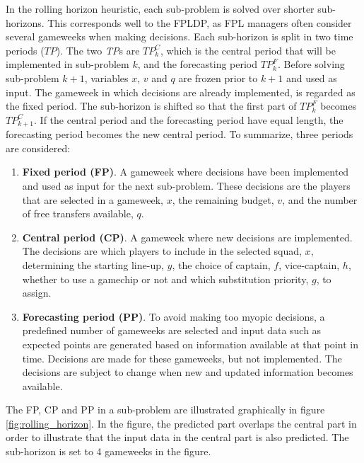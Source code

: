 \newpar

In the rolling horizon heuristic, each sub-problem is solved over shorter sub-horizons. This corresponds well to the FPLDP, as FPL managers often consider several gameweeks when making decisions. Each sub-horizon is split in two time periods ($TP$). The two \textit{TP}s are $TP_k^{C}$, which is the central period that will be implemented in sub-problem $k$, and the forecasting period $TP_k^{F}$. Before solving sub-problem $k+1$, variables $x$, $v$ and $q$ are frozen prior to $k+1$ and used as input. The gameweek in which decisions are already implemented, is regarded as the fixed period. The sub-horizon is shifted so that the first part of $TP_k^{F}$ becomes $TP_{k+1}^{C}$. If the central period and the forecasting period have equal length, the forecasting period becomes the new central period. To summarize, three periods are considered:

\begin{enumerate}[label=(\roman*)]
    \item \textbf{Fixed period (FP)}. A gameweek where decisions have been implemented and used as input for the next sub-problem. These decisions are the players that are selected in a gameweek, $x$, the remaining budget, $v$, and the number of free transfers available, $q$.
    \item \textbf{Central period (CP)}. A gameweek where new decisions are implemented. The decisions are which players to include in the selected squad, $x$, determining the starting line-up, $y$, the choice of captain, $f$,  vice-captain, $h$, whether to use a gamechip or not and which substitution priority, $g$, to assign.  
    \item \textbf{Forecasting period (PP)}. To avoid making too myopic decisions, a predefined number of gameweeks are selected and input data such as expected points are generated based on information available at that point in time. Decisions are made for these gameweeks, but not implemented.  The decisions are subject to change when new and updated information becomes available. 
\end{enumerate}

The FP, CP and PP in a sub-problem are illustrated graphically in figure \ref{fig:rolling_horizon}. In the figure, the predicted part overlaps the central part in order to illustrate that the input data in the central part is also predicted. The sub-horizon is set to 4 gameweeks in the figure. 

